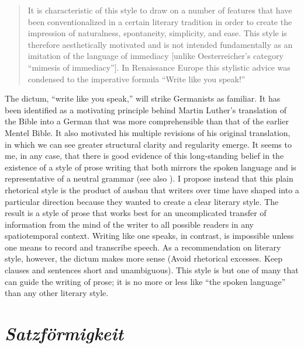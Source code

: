 \begin{quote}
It is characteristic of this style to draw on a number of features that have been conventionalized in a certain literary tradition in order to create the impression of naturalness, spontaneity, simplicity, and ease. This style is therefore aesthetically motivated and is not intended fundamentally as an imitation of the language of immediacy [unlike Oesterreicher’s category “mimesis of immediacy”]. In Renaissance Europe this stylistic advice was condensed to the imperative formula “Write like you speak!”
\end{quote}

\noindent The dictum, “write like you speak,” will strike Germanists as familiar. It has been identified as a motivating principle behind Martin Luther’s translation of the Bible into a German that was more comprehensible than that of the earlier Mentel Bible. It also motivated his multiple revisions of his original translation, in which we can see greater structural clarity and regularity emerge. It seems to me, in any case, that there is good evidence of this long-standing belief in the existence of a style of prose writing that both mirrors the spoken language and is representative of a neutral grammar (see also ). I propose instead that this plain rhetorical style is the product of ausbau that writers over time have shaped into a particular direction because they wanted to create a clear literary style. The result is a style of prose that works best for an uncomplicated transfer of information from the mind of the writer to all possible readers in any spatiotemporal context. Writing like one speaks, in contrast, is impossible unless one means to record and transcribe speech. As a recommendation on literary style, however, the dictum makes more sense (Avoid rhetorical excesses. Keep clauses and sentences short and unambiguous). This style is but one of many that can guide the writing of prose; it is no more or less like “the spoken language” than any other literary style.

\section{\textit{Satzförmigkeit}}\label{sec:7.2}

